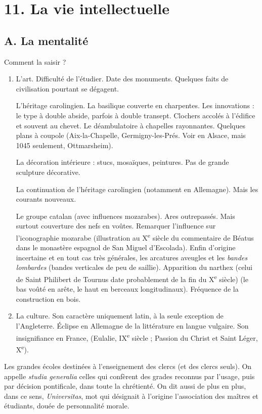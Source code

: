 \documentclass[french,twoside]{book} %
\newcommand\chapteropen{} %
\newcommand\chaptercont{} %
\begin{document}
\chapteropen
\chapter[11. La vie intellectuelle]{\textsc{11. }La vie intellectuelle}
\label{c11}

\chaptercont
\section[A. La mentalité]{A. La mentalité}
\label{c11a}
\noindent  {}
\label{p115} Comment la saisir ?\par

\begin{enumerate}[itemsep=\baselineskip,]
\item L’art. Difficulté de l’étudier. Date des monuments. Quelques faits de civilisation pourtant se dégagent.\par
L’héritage carolingien. La basilique couverte en charpentes. Les innovations : le type à double abside, parfois à double transept. Clochers accolés à l’édifice et souvent au chevet. Le déambulatoire à chapelles rayonnantes. Quelques plans à coupole (Aix-la-Chapelle, Germigny-les-Prés. Voir en Alsace, mais 1045 seulement, Ottmarsheim).\par
La décoration intérieure : stucs, mosaïques, peintures. Pas de grande sculpture décorative.\par
La continuation de l’héritage carolingien (notamment en Allemagne). Mais les courants nouveaux.\par
Le groupe catalan (avec influences mozarabes). Ares outrepassés. Mais surtout couverture des nefs en voûtes. Remarquer l’influence sur l’iconographie mozarabe (illustration au X\textsuperscript{e} siècle du commentaire de Béatus dans le monastère espagnol de San Miguel d’Escolada). Enfin d’origine incertaine et en tout cas très générales, les arcatures aveugles et les \emph{bandes lombardes} (bandes verticales de peu de saillie). Apparition du narthex (celui de Saint Philibert de Tournus date probablement de la fin du X\textsuperscript{e} siècle) (le bas voûté en arête, le haut en berceaux longitudinaux). Fréquence de la construction en bois.

\item La culture. Son caractère uniquement latin, à la seule exception de l’Angleterre. Éclipse en Allemagne de la littérature en langue vulgaire. Son insignifiance en France, (Eulalie, IX\textsuperscript{e} siècle ; Passion du Christ et Saint Léger, X\textsuperscript{e}).

\end{enumerate}\noindent Les grandes écoles destinées à l’enseignement des clercs (et des clercs seuls). On appelle \emph{studia generalia} celles qui confèrent des grades reconnus par l’usage, puis par décision pontificale, dans toute la chrétienté. On dit aussi de plus en plus, dans ce sens, {\itshape Universitas}, mot qui désignait à l’origine l’association des maîtres et étudiants, douée de personnalité morale.
\end{document}
